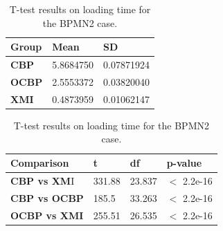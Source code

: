 \documentclass{llncs}
\begin{document}
    \begin{table}[ht]
        \centering
        \label{table:ttest_load_time_bpmn2}
        \caption{T-test results on loading time for the BPMN2 case.}
        \begin{minipage}{0.44\textwidth}
            \centering
            \begin{tabular}{|p{}|p{}|p{}|}
                \hline 
                \textbf{Group}  & \textbf{Mean} & \textbf{SD} \\ 
                \hline 
                \textbf{CBP} & 5.8684750   &0.07871924 \\ 
                \hline 
                \textbf{OCBP} & 2.5553372  & 0.03820040  \\ 
                \hline 
                \textbf{XMI} & 0.4873959   & 0.01062147\\ 
                \hline 
            \end{tabular} 
        \end{minipage}
        \hfill
        \begin{minipage}{0.54\textwidth}
            \centering
            \begin{tabular}{|p{}|p{}|p{}|p{}|}
                \hline 
                \textbf{Comparison} & \textbf{t}  & \textbf{df} & \textbf{p-value} \\ 
                \hline 
                \textbf{CBP vs XM}I & 331.88    &23.837 & $<$ 2.2e-16 \\ 
                \hline 
                \textbf{CBP vs OCBP} & 185.5 & 33.263  & $<$ 2.2e-16 \\ 
                \hline 
                \textbf{OCBP vs XMI} & 255.51    & 26.535  & $<$ 2.2e-16 \\ 
                \hline 
            \end{tabular} 
        \end{minipage}
    \end{table}
    
\end{document}
